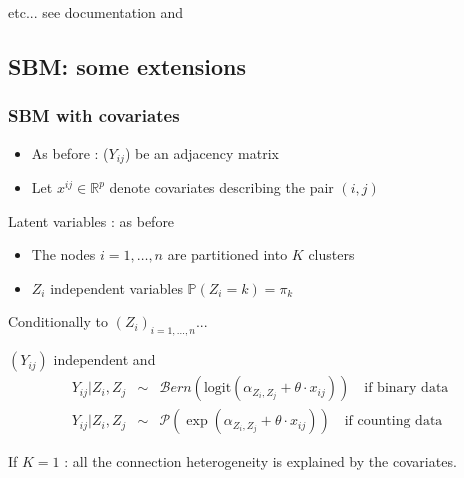 \documentclass{beamer}\usepackage[]{graphicx}\usepackage[]{color}
\begin{document}
\begin{frame}
etc... see documentation and 

\end{frame}

\subsection{SBM: some extensions}

\begin{frame}
 \frametitle{SBM with covariates}

\begin{itemize}
\item As before :  ($Y_{ij}$) be an adjacency matrix 
\item  Let   $x^{ij} \in \mathbb{R}^p$  denote covariates describing the pair $(i,j)$
\end{itemize}

\begin{block}{Latent variables : as before }
\begin{itemize}
\item The nodes $i= 1,\dots,n$ are partitioned into $K$ clusters
\item $Z_i$ independent variables $ \mathbb{P}(Z_i = k) = \pi_k$
\end{itemize}
\end{block}
 
\begin{block}{Conditionally to $(Z_i)_{i=1,\dots,n}$... }

$(Y_{ij})$ independent and 
\begin{eqnarray*}
 Y_{ij}  | Z_i, Z_j&\sim&   \mathcal{B}ern(\mbox{logit}(\alpha_{Z_i,Z_j} + \theta \cdot x_{ij}) ) \quad \mbox {if binary data} \\
 Y_{ij}  | Z_i, Z_j  &\sim&  \mathcal{P}(\exp(\alpha_{Z_i,Z_j} + \theta  \cdot x_{ij}) ) \quad \mbox {if counting data} 
\end{eqnarray*}
\end{block}


If $K = 1$ : all the connection heterogeneity is explained by the covariates. 
 \end{frame}
\end{document}
